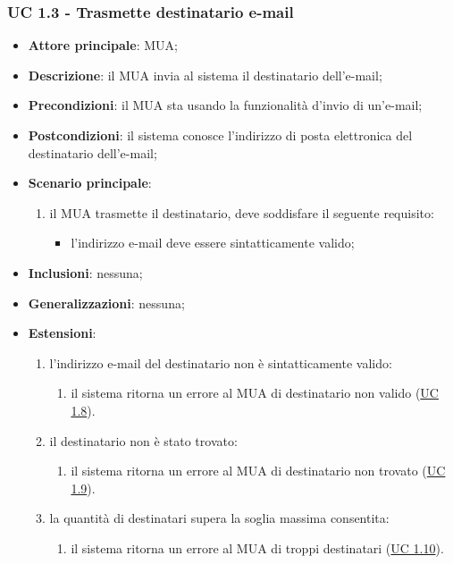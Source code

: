     \subsubsection{UC 1.3 - Trasmette destinatario e-mail} \label{sec:UC1.3}
    \begin{itemize}
        \item \textbf{Attore principale}: MUA;
        \item \textbf{Descrizione}: il MUA invia al sistema il destinatario dell'e-mail;
        \item \textbf{Precondizioni}: il MUA sta usando la funzionalità d'invio di un'e-mail;
        \item \textbf{Postcondizioni}: il sistema conosce l'indirizzo di posta elettronica del destinatario dell'e-mail;
        \item \textbf{Scenario principale}:
            \begin{enumerate}
                \item il MUA trasmette il destinatario, deve soddisfare il seguente requisito:
                    \begin{itemize}
                        \item l'indirizzo e-mail deve essere sintatticamente valido;
                    \end{itemize}
            \end{enumerate}
        \item \textbf{Inclusioni}: nessuna;
        \item \textbf{Generalizzazioni}: nessuna;
        \item \textbf{Estensioni}:
            \begin{enumerate}[label=\alph*.]
                \item l'indirizzo e-mail del destinatario non è sintatticamente valido:
                \begin{enumerate}[label=\arabic*.]
                    \item il sistema ritorna un errore al MUA di destinatario non valido (\hyperref[sec:UC1.8]{UC 1.8}).
                \end{enumerate}
                \item il destinatario non è stato trovato:
                \begin{enumerate}[label=\arabic*.]
                    \item il sistema ritorna un errore al MUA di destinatario non trovato (\hyperref[sec:UC1.9]{UC 1.9}).
                \end{enumerate}
                \item la quantità di destinatari supera la soglia massima consentita:
                \begin{enumerate}[label=\arabic*.]
                    \item il sistema ritorna un errore al MUA di troppi destinatari (\hyperref[sec:UC1.10]{UC 1.10}).
                \end{enumerate}
            \end{enumerate}
    \end{itemize}

